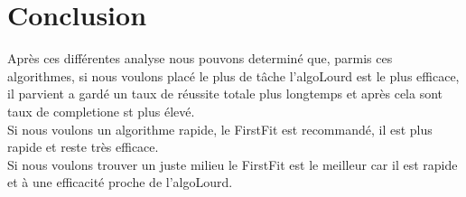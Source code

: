 \documentclass[11pt]{article}
\begin{document}
\section{Conclusion}

Après ces différentes analyse nous pouvons determiné que, parmis ces algorithmes, si nous voulons placé le plus de tâche l'algoLourd est le plus efficace, il parvient a gardé un taux de réussite totale plus longtemps et après cela sont taux de completione st plus élevé.\\
Si nous voulons un algorithme rapide, le FirstFit est recommandé, il est plus rapide et reste très efficace. \\
Si nous voulons trouver un juste milieu le FirstFit est le meilleur car il est rapide et à une efficacité proche de l'algoLourd.\\

\newpage
\end{document}
